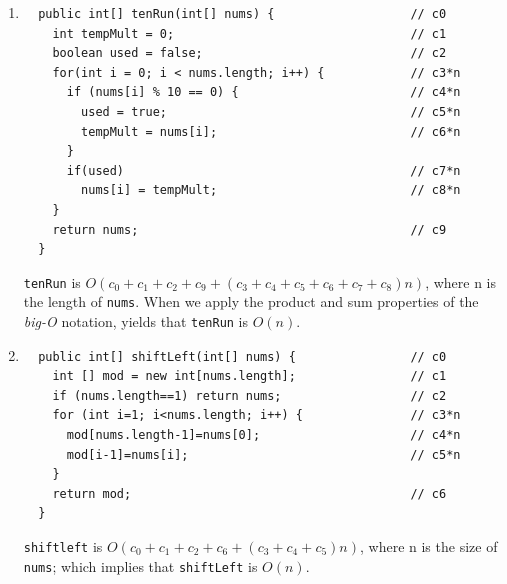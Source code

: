 \documentclass[a4paper,12pt]{article}
\begin{document}
\begin{enumerate}
  \item \begin{Verbatim}
  public int[] tenRun(int[] nums) {                   // c0
    int tempMult = 0;                                 // c1
    boolean used = false;                             // c2
    for(int i = 0; i < nums.length; i++) {            // c3*n
      if (nums[i] % 10 == 0) {                        // c4*n
        used = true;                                  // c5*n
        tempMult = nums[i];                           // c6*n
      }
      if(used)                                        // c7*n
        nums[i] = tempMult;                           // c8*n
    }
    return nums;                                      // c9
  }
  \end{Verbatim}
  \texttt{tenRun} is $O(c_0+c_1+c_2+c_9+(c_3+c_4+c_5+c_6+c_7+c_8)n)$, where n is the length of \texttt{nums}. When we apply
  the product and sum properties of the \textit{big-O} notation, yields that
  \texttt{tenRun} is $O(n)$.

  \item \begin{Verbatim}
  public int[] shiftLeft(int[] nums) {                // c0
    int [] mod = new int[nums.length];                // c1
    if (nums.length==1) return nums;                  // c2
    for (int i=1; i<nums.length; i++) {               // c3*n
      mod[nums.length-1]=nums[0];                     // c4*n
      mod[i-1]=nums[i];                               // c5*n
    }
    return mod;                                       // c6
  }
  \end{Verbatim}
  \texttt{shiftleft} is $O(c_0+c_1+c_2+c_6+(c_3+c_4+c_5)n)$, where n is the size of \texttt{nums}; which implies
  that \texttt{shiftLeft} is $O(n)$.
  \end{enumerate}
\end{document}
